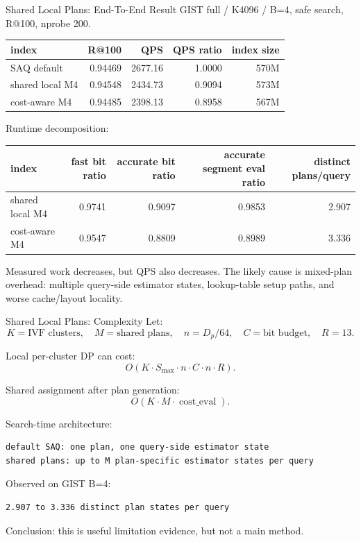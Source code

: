 \documentclass[aspectratio=169,10pt]{beamer}
\begin{document}
\begin{frame}[fragile]{Shared Local Plans: End-To-End Result}
\scriptsize
GIST full / K4096 / B=4, safe search, R@100, nprobe 200.

\vspace{0.5em}
\begin{tabular}{lrrrr}
\toprule
index & R@100 & QPS & QPS ratio & index size \\
\midrule
SAQ default & 0.94469 & 2677.16 & 1.0000 & 570M \\
shared local M4 & 0.94548 & 2434.73 & 0.9094 & 573M \\
cost-aware M4 & 0.94485 & 2398.13 & 0.8958 & 567M \\
\bottomrule
\end{tabular}

\vspace{1em}
Runtime decomposition:

\begin{tabular}{lrrrr}
\toprule
index & fast bit ratio & accurate bit ratio & accurate segment eval ratio & distinct plans/query \\
\midrule
shared local M4 & 0.9741 & 0.9097 & 0.9853 & 2.907 \\
cost-aware M4 & 0.9547 & 0.8809 & 0.8989 & 3.336 \\
\bottomrule
\end{tabular}

\vspace{1em}
\small
Measured work decreases, but QPS also decreases. The likely cause is mixed-plan
overhead: multiple query-side estimator states, lookup-table setup paths, and
worse cache/layout locality.
\end{frame}

\begin{frame}[fragile]{Shared Local Plans: Complexity}
\small
Let:
\[
K=\text{IVF clusters},\quad M=\text{shared plans},\quad
n=D_p/64,\quad C=\text{bit budget},\quad R=13.
\]

Local per-cluster DP can cost:
\[
O(K\cdot S_{\max}\cdot n\cdot C\cdot n\cdot R).
\]

Shared assignment after plan generation:
\[
O(K\cdot M\cdot \operatorname{cost\_eval}).
\]

Search-time architecture:
\begin{lstlisting}
default SAQ: one plan, one query-side estimator state
shared plans: up to M plan-specific estimator states per query
\end{lstlisting}

Observed on GIST B=4:
\begin{lstlisting}
2.907 to 3.336 distinct plan states per query
\end{lstlisting}

Conclusion: this is useful limitation evidence, but not a main method.
\end{frame}
\end{document}
